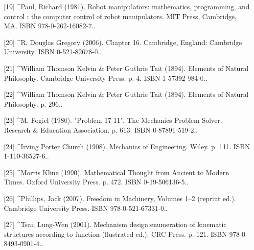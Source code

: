 [19]
^Paul, Richard (1981). Robot manipulators: mathematics, programming, and control : the computer control of robot manipulators. MIT Press, Cambridge, MA. ISBN 978-0-262-16082-7..

[20]
^R. Douglas Gregory (2006). Chapter 16. Cambridge, England: Cambridge University. ISBN 0-521-82678-0..

[21]
^William Thomson Kelvin & Peter Guthrie Tait (1894). Elements of Natural Philosophy. Cambridge University Press. p. 4. ISBN 1-57392-984-0..

[22]
^William Thomson Kelvin & Peter Guthrie Tait (1894). Elements of Natural Philosophy. p. 296..

[23]
^M. Fogiel (1980). "Problem 17-11". The Mechanics Problem Solver. Research & Education Association. p. 613. ISBN 0-87891-519-2..

[24]
^Irving Porter Church (1908). Mechanics of Engineering. Wiley. p. 111. ISBN 1-110-36527-6..

[25]
^Morris Kline (1990). Mathematical Thought from Ancient to Modern Times. Oxford University Press. p. 472. ISBN 0-19-506136-5..

[26]
^Phillips, Jack (2007). Freedom in Machinery, Volumes 1–2 (reprint ed.). Cambridge University Press. ISBN 978-0-521-67331-0..

[27]
^Tsai, Lung-Wen (2001). Mechanism design:enumeration of kinematic structures according to function (llustrated ed.). CRC Press. p. 121. ISBN 978-0-8493-0901-4..